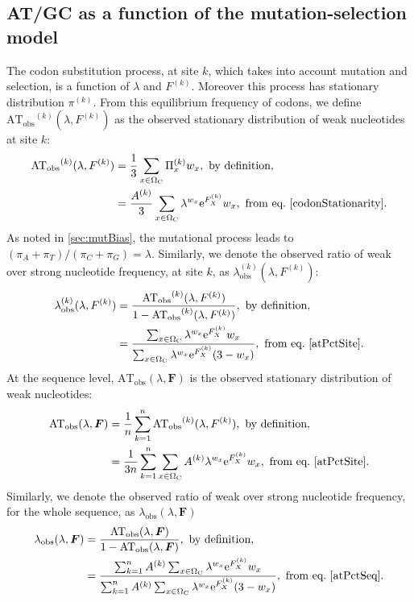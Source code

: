 \subsection{AT/GC as a function of the mutation-selection model}
The codon substitution process, at site $k$, which takes into account mutation and selection, is a function of $\lambda$ and $F^{(k)}$. Moreover this process has stationary distribution $\pi^{(k)}$. From this equilibrium frequency of codons, we define $\mathrm{AT_{obs}}^{(k)}(\lambda, F^{(k)})$ as the observed stationary distribution of weak nucleotides at site $k$:
\begin{align}
\mathrm{AT_{obs}}^{(k)}(\lambda, F^{(k)})
& =\frac{1}{3} \sum_{x \in \Omega_{\mathrm{C}}} \Pi_x^{(k)} w_x , \ \textrm{by definition},\\
& =\frac{A^{(k)}}{3} \sum_{x \in \Omega_{\mathrm{C}}} \lambda^{w_x} \mathrm{e}^{F_X^{(k)}} w_x , \ \textrm{from eq.} \ \ref{codonStationarity}.
\label{atPctSite}
\end{align}
As noted in \ref{sec:mutBias}, the mutational process leads to $(\pi_A+\pi_T)/(\pi_C+\pi_G) = \lambda$. Similarly, we denote the observed ratio of weak over strong nucleotide frequency, at site $k$, as $\lambda_{\mathrm{obs}}^{(k)} (\lambda, F^{(k)})$:
\begin{align}
\lambda_{\mathrm{obs}}^{(k)} (\lambda, F^{(k)})
& =\dfrac{\mathrm{AT_{obs}}^{(k)}(\lambda, F^{(k)})}{1 - \mathrm{AT_{obs}}^{(k)}(\lambda, F^{(k)}) }, \ \textrm{by definition},\\
& =\dfrac{ \sum_{x \in \SetCodon} \lambda^{w_x} \e^{F_X^{(k)}} w_x}{\sum_{x \in \SetCodon} \lambda^{w_x} \e^{F_X^{(k)}} (3 - w_x )}, \ \textrm{from eq.} \ \ref{atPctSite}.
\end{align}
At the sequence level, $\mathrm{AT_{obs}}(\lambda, \bm{F})$ is the observed stationary distribution of weak nucleotides:
\begin{align}
\mathrm{AT_{obs}}(\lambda, \bm{F})
& =\frac{1}{n}\sum_{k=1}^{n} \mathrm{AT_{obs}}^{(k)}(\lambda, F^{(k)}), \ \textrm{by definition}, \\
& =\frac{1}{3n}\sum_{k=1}^{n} \sum_{x \in \SetCodon} A^{(k)} \lambda^{w_x} \e^{F_X^{(k)}} w_x , \ \textrm{from eq.} \ \ref{atPctSite}.
\label{atPctSeq}
\end{align}
Similarly, we denote the observed ratio of weak over strong nucleotide frequency, for the whole sequence, as $\lambda_{\mathrm{obs}} (\lambda, \bm{F})$
\begin{align}
\lambda_{\mathrm{obs}} (\lambda, \bm{F})
& = \frac{\mathrm{AT_{obs}}(\lambda, \bm{F})}{ 1 - \mathrm{AT_{obs}}(\lambda, \bm{F}) }, \ \textrm{by definition},\\
& =\dfrac{ \sum_{k=1}^{n}  A^{(k)} \sum_{x \in \Omega_{\mathrm{C}}} \lambda^{w_x} \mathrm{e}^{F_X^{(k)}} w_x}{ \sum_{k=1}^{n} A^{(k)} \sum_{x \in \Omega_{\mathrm{C}}} \lambda^{w_x} \mathrm{e}^{F_X^{(k)}} (3 - w_x )}, \ \textrm{from eq.} \ \ref{atPctSeq}.
\end{align}
